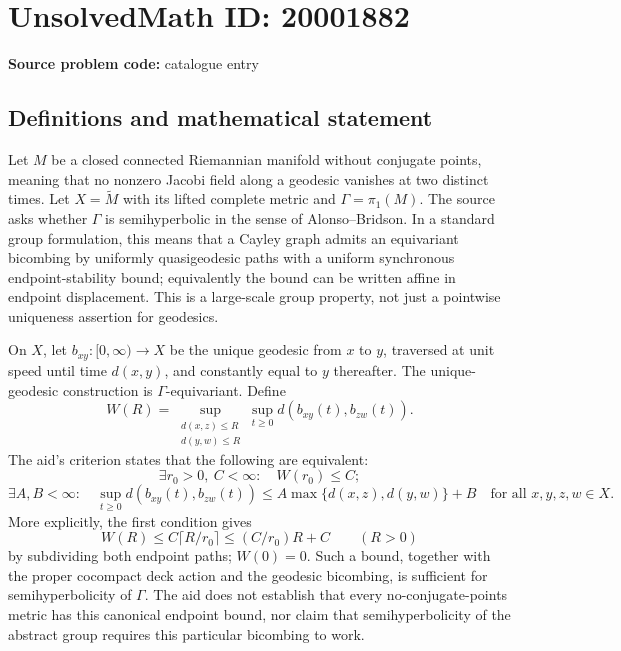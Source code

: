 \documentclass[11pt]{article}
\begin{document}
\section*{UnsolvedMath ID: 20001882}
\textbf{Source problem code:} catalogue entry
\subsection{Definitions and mathematical statement}
Let \(M\) be a closed connected Riemannian manifold without conjugate points, meaning that no nonzero Jacobi field along a geodesic vanishes at two distinct times. Let \(X=\widetilde M\) with its lifted complete metric and \(\Gamma=\pi_1(M)\). The source asks whether \(\Gamma\) is semihyperbolic in the sense of Alonso--Bridson. In a standard group formulation, this means that a Cayley graph admits an equivariant bicombing by uniformly quasigeodesic paths with a uniform synchronous endpoint-stability bound; equivalently the bound can be written affine in endpoint displacement. This is a large-scale group property, not just a pointwise uniqueness assertion for geodesics.

On \(X\), let \(b_{xy}:[0,\infty)\to X\) be the unique geodesic from \(x\) to \(y\), traversed at unit speed until time \(d(x,y)\), and constantly equal to \(y\) thereafter. The unique-geodesic construction is \(\Gamma\)-equivariant. Define
\[
 W(R)=\sup_{\substack{d(x,z)\leq R\\d(y,w)\leq R}}
       \sup_{t\geq0}d(b_{xy}(t),b_{zw}(t)).
\]
The aid's criterion states that the following are equivalent:
\[
 \exists r_0>0,\ C<\infty:\quad W(r_0)\leq C;
\]
\[
 \exists A,B<\infty:\quad
 \sup_{t\geq0}d(b_{xy}(t),b_{zw}(t))
 \leq A\max\{d(x,z),d(y,w)\}+B
 \quad\text{for all }x,y,z,w\in X.
\]
More explicitly, the first condition gives
\[
 W(R)\leq C\lceil R/r_0\rceil\leq (C/r_0)R+C
 \qquad(R>0)
\]
by subdividing both endpoint paths; \(W(0)=0\). Such a bound, together with the proper cocompact deck action and the geodesic bicombing, is sufficient for semihyperbolicity of \(\Gamma\). The aid does not establish that every no-conjugate-points metric has this canonical endpoint bound, nor claim that semihyperbolicity of the abstract group requires this particular bicombing to work.
\end{document}
